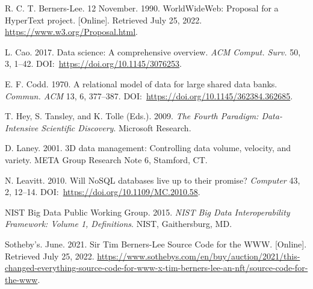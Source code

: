 \begin{thebibliography}{}

 R. C. T. Berners-Lee. 12 November. 1990. WorldWideWeb: Proposal for a HyperText project. [Online]. Retrieved July 25, 2022. \href{https://www.w3.org/Proposal.html}{https://{\allowbreak}www.{\allowbreak}w3.{\allowbreak}org/{\allowbreak}Proposal.{\allowbreak}html}.

 L. Cao. 2017. Data science: A comprehensive overview. \textit{ACM Comput. Surv.} 50, 3, 1--42. DOI:~\href{https://doi.org/10.1145/3076253}{https://{\allowbreak}doi.{\allowbreak}org/{\allowbreak}10.{\allowbreak}1145/{\allowbreak}3076253}.

 E. F. Codd. 1970. A relational model of data for large shared data banks. \textit{Commun. ACM} 13, 6, 377--387. DOI:~\href{https://doi.org/10.1145/362384.362685}{https://{\allowbreak}doi.{\allowbreak}org/{\allowbreak}10.{\allowbreak}1145/{\allowbreak}362384.{\allowbreak}362685}.

 T. Hey, S. Tansley, and K. Tolle (Eds.). 2009. \textit{The Fourth Paradigm: Data-Intensive Scientific Discovery}. Microsoft Research.

 D. Laney. 2001. 3D data management: Controlling data volume, velocity, and variety. META Group Research Note 6, Stamford, CT.

 N. Leavitt. 2010. Will NoSQL databases live up to their promise? \textit{Computer} 43, 2, 12--14. DOI:~\href{https://doi.org/10.1109/MC.2010.58}{https://{\allowbreak}doi.{\allowbreak}org/{\allowbreak}10.{\allowbreak}1109/{\allowbreak}MC.{\allowbreak}2010.58}.

 NIST Big Data Public Working Group. 2015. \textit{NIST Big Data Interoperability Framework: Volume 1, Definitions}. NIST, Gaithersburg, MD.

 Sotheby's. June. 2021. Sir Tim Berners-Lee Source Code for the WWW. [Online]. Retrieved July 25, 2022. \href{https://www.sothebys.com/en/buy/auction/2021/this-changed-everything-source-code-for-www-x-tim-berners-lee-an-nft/source-code-for-the-www}{https://{\allowbreak}www.{\allowbreak}sothebys.{\allowbreak}com/{\allowbreak}en/{\allowbreak}buy/{\allowbreak}auction/{\allowbreak}2021/{\allowbreak}this-{\allowbreak}changed-{\allowbreak}everything-{\allowbreak}source-{\allowbreak}code-{\allowbreak}for-{\allowbreak}www-{\allowbreak}x-{\allowbreak}tim-{\allowbreak}berners-{\allowbreak}lee-{\allowbreak}an-{\allowbreak}nft/{\allowbreak}source-{\allowbreak}code-{\allowbreak}for-{\allowbreak}the-www}.

\end{thebibliography}

% 